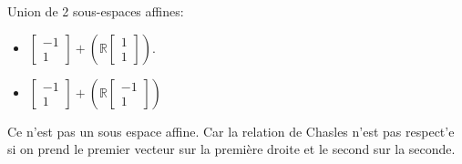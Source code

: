 \documentclass[]{book}
\theoremstyle{definition}
\newcommand{\bb}[1]{\mathbb{#1}}
\newcommand{\R}{\bb{R}}
\begin{document}

Union de 2 sous-espaces affines:
\begin{itemize}
    \item $\begin{bmatrix} -1 \\ 1 \end{bmatrix} + (\R \begin{bmatrix} 1 \\ 1 \end{bmatrix})$.
    \item $\begin{bmatrix} -1 \\ 1 \end{bmatrix} + (\R \begin{bmatrix} -1 \\ 1 \end{bmatrix})$
\end{itemize}
Ce n'est pas un sous espace affine. Car la relation de Chasles n'est pas respect'e si on prend le premier vecteur sur la premi\`ere droite et le second sur la seconde.
\end{document}
